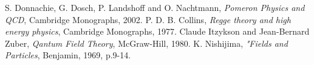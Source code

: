 \documentclass{article}
\begin{document}
\begin{comment}
\newpage
\setcounter{section}{10}
\section{interference terms}
\section{$\gamma p \rightarrow \phi X$}
\section{Sasha PRC72}
\section{$\gamma p \rightarrow K \Lambda$}
\end{comment}

\newpage
\begin{thebibliography}{9}
 S. Donnachie, G. Dosch, P. Landshoff and O. Nachtmann, 
	{\it Pomeron Physics and QCD}, Cambridge Monographs, 2002.
 P. D. B. Collins,
	{\it Regge theory and high energy physics}, Cambridge Monographs, 1977.
 Claude Itzykson and Jean-Bernard Zuber,
	{\it Qantum Field Theory}, McGraw-Hill, 1980.
 K. Nishijima, {\it "Fields and Particles}, Benjamin, 1969, p.9-14.
\end{thebibliography}
\end{document}
